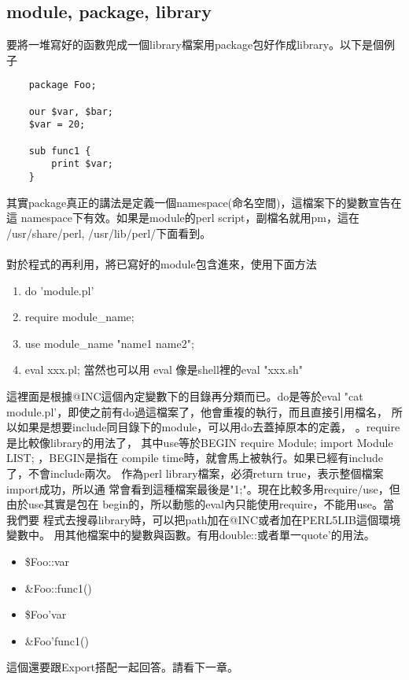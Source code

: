     \subsection{module, package, library}
    要將一堆寫好的函數兜成一個library檔案用package包好作成library。以下是個例子
    \begin{verbatim}
    package Foo;

    our $var, $bar;
    $var = 20;

    sub func1 {
        print $var;
    }
    \end{verbatim}
    其實package真正的講法是定義一個namespace(命名空間)，這檔案下的變數宣告在這
    namespace下有效。如果是module的perl script，副檔名就用pm，這在
    /usr/share/perl, /usr/lib/perl/下面看到。
    \\\\
    對於程式的再利用，將已寫好的module包含進來，使用下面方法
    \begin{enumerate}
    \item do 'module.pl'
    \item require module\_name;
    \item use module\_name "name1 name2";
    \item eval xxx.pl; 當然也可以用 eval 像是shell裡的eval "xxx.sh"
    \end{enumerate}
    這裡面是根據@INC這個內定變數下的目錄再分類而已。do是等於eval "cat
    module.pl'，即使之前有do過這檔案了，他會重複的執行，而且直接引用檔名，
    所以如果是想要include同目錄下的module，可以用do去蓋掉原本的定義，
    。require是比較像library的用法了，
    其中use等於BEGIN { require Module; import Module LIST; }，BEGIN是指在
    compile time時，就會馬上被執行。如果已經有include了，不會include兩次。
    作為perl library檔案，必須return true，表示整個檔案import成功，所以通
    常會看到這種檔案最後是"1;"。現在比較多用require/use，但由於use其實是包在
    begin的，所以動態的eval內只能使用require，不能用use。當我們要
    程式去搜尋library時，可以把path加在@INC或者加在PERL5LIB這個環境變數中。
    用其他檔案中的變數與函數。有用double::或者單一quote'的用法。
    \begin{itemize}
    \item \$Foo::var
    \item \&Foo::func1()
    \item \$Foo'var
    \item \&Foo'func1()
    \end{itemize}
    這個還要跟Export搭配一起回答。請看下一章。

